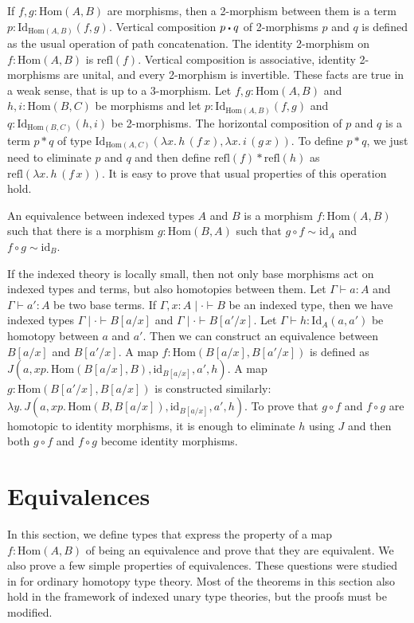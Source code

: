\documentclass[reqno]{amsart}
\theoremstyle{definition}
\theoremstyle{remark}
\newcommand{\ob}{}
\newcommand{\fs}[1]{\mathrm{#1}}
\newcommand{\Hom}{\fs{Hom}}
\newcommand{\Id}{\fs{Id}}
\newcommand{\refl}{\fs{refl}}
\newcommand{\id}{\fs{id}}
\numberwithin{figure}{section}
\newcommand{\ct}{%
  \mathchoice{\mathbin{\raisebox{0.25ex}{$\displaystyle\centerdot$}}}%
             {\mathbin{\raisebox{0.25ex}{$\centerdot$}}}%
             {\mathbin{\raisebox{0.25ex}{$\scriptstyle\,\centerdot\,$}}}%
             {\mathbin{\raisebox{0.25ex}{$\scriptscriptstyle\,\centerdot\,$}}}
}
\begin{document}
If $f,g : \Hom(A,B)$ are morphisms, then a 2-morphism between them is a term $p : \Id_{\Hom(A,B)}(f,g)$.
Vertical composition $p \ct q$ of 2-morphisms $p$ and $q$ is defined as the usual operation of path concatenation.
The identity 2-morphism on $f : \Hom(A,B)$ is $\refl(f)$.
Vertical composition is associative, identity 2-morphisms are unital, and every 2-morphism is invertible.
These facts are true in a weak sense, that is up to a 3-morphism.
Let $f,g : \Hom(A,B)$ and $h,i : \Hom(B,C)$ be morphisms and let $p : \Id_{\Hom(A,B)}(f,g)$ and $q : \Id_{\Hom(B,C)}(h,i)$ be 2-morphisms.
The horizontal composition of $p$ and $q$ is a term $p * q$ of type $\Id_{\Hom(A,C)}(\lambda x.\,h\,(f\,x), \lambda x.\,i\,(g\,x))$.
To define $p * q$, we just need to eliminate $p$ and $q$ and then define $\refl(f) * \refl(h)$ as $\refl(\lambda x.\,h\,(f\,x))$.
It is easy to prove that usual properties of this operation hold.

\begin{defn}
An equivalence between indexed types $A$ and $B$ is a morphism $f : \Hom(A,B)$ such that there is a morphism $g : \Hom(B,A)$ such that $g \circ f \sim \id_A$ and $f \circ g \sim \id_B$.
\end{defn}

If the indexed theory is locally small, then not only base morphisms act on indexed types and terms, but also homotopies between them.
Let $\Gamma \vdash a : A$ and $\Gamma \vdash a' : A$ be two base terms.
If $\Gamma, x : A \mid \cdot \vdash B \ob$ be an indexed type, then we have indexed types $\Gamma \mid \cdot \vdash B[a/x] \ob$ and $\Gamma \mid \cdot \vdash B[a'/x] \ob$.
Let $\Gamma \vdash h : \Id_A(a,a')$ be homotopy between $a$ and $a'$.
Then we can construct an equivalence between $B[a/x]$ and $B[a'/x]$.
A map $f : \Hom(B[a/x],B[a'/x])$ is defined as $J(a, x p.\,\Hom(B[a/x],B), \id_{B[a/x]}, a', h)$.
A map $g : \Hom(B[a'/x],B[a/x])$ is constructed similarly: $\lambda y.\,J(a, x p.\,\Hom(B,B[a/x]), \id_{B[a/x]}, a', h)$.
To prove that $g \circ f$ and $f \circ g$ are homotopic to identity morphisms, it is enough to eliminate $h$ using $J$ and then both $g \circ f$ and $f \circ g$ become identity morphisms.

\section{Equivalences}

In this section, we define types that express the property of a map $f : \Hom(A,B)$ of being an equivalence and prove that they are equivalent.
We also prove a few simple properties of equivalences.
These questions were studied in \cite[Section~4]{hottbook} for ordinary homotopy type theory.
Most of the theorems in this section also hold in the framework of indexed unary type theories, but the proofs must be modified.
\end{document}
